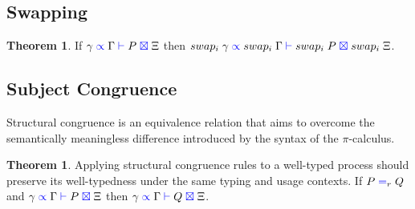 \documentclass[a4paper,UKenglish,cleveref, autoref, thm-restate,authorcolumns]{lipics-v2019}
\theoremstyle{definition}
\newtheorem{nitheorem}[theorem]{Theorem}
\newcommand{\picalc}{$\pi$-calculus}
\newcommand{\type}[1]{\textcolor{blue}{\operatorname{#1}}}
\newcommand{\types}[4]{#1 \; \type{\propto} \; #2 \; \type{\vdash} \; #3 \; \type{\boxtimes} \; #4}
\newcommand{\eq}[1]{\; \type{=}_{#1} \;}
\begin{document}
\subsection{Swapping}

\begin{nitheorem}
  \label{thm:swapping}
  If $\types{\gamma}{\Gamma}{P}{\Xi}$ then $\types{swap_i \; \gamma}{swap_i \; \Gamma}{swap_i \; P}{swap_i \; \Xi}$.
\end{nitheorem}

\todo{}

\subsection{Subject Congruence}
\label{subject-congruence}

Structural congruence is an equivalence relation that aims to overcome the semantically meaningless difference introduced by the syntax of the \picalc{}.

\begin{nitheorem}
  \label{thm:subject-congruence}
  Applying structural congruence rules to a well-typed process should preserve its well-typedness under the same typing and usage contexts.
  If $P \eq{r} Q$ and $\types{\gamma}{\Gamma}{P}{\Xi}$ then $\types{\gamma}{\Gamma}{Q}{\Xi}$.
\end{nitheorem}
\end{document}
